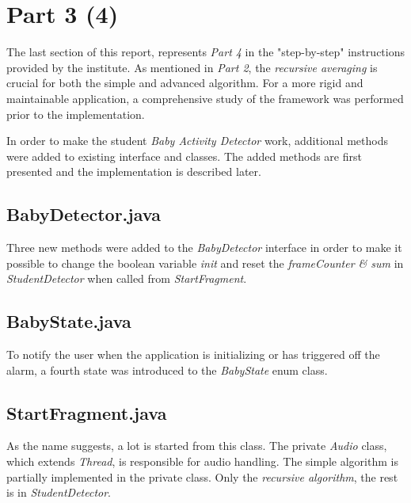 \newpage
\section{Part 3 (4)}
The last section of this report, represents \emph{Part 4} in the "step-by-step"
instructions provided by the institute. As mentioned in \emph{Part 2}, the 
\emph{recursive averaging} is crucial for both the simple and advanced algorithm. 
For a more rigid and maintainable application, a comprehensive study of the 
framework was performed prior to the implementation. 

In order to make the student \emph{Baby Activity Detector} work, additional
methods were added to existing interface and classes. The added methods are
first presented and the implementation is described later.

\subsection{BabyDetector.java}
Three new methods were added to the \emph{BabyDetector} interface in order to
make it possible to change the boolean variable \emph{init} and reset the 
\emph{frameCounter \& sum} in \emph{StudentDetector} when called from
\emph{StartFragment}.  



\subsection{BabyState.java}
To notify the user when the application is initializing or has
triggered off the alarm, a fourth state was introduced to the \emph{BabyState}
enum class. 



\subsection{StartFragment.java}
As the name suggests, a lot is started from this class. The private \emph{Audio}
class, which extends \emph{Thread}, is responsible for audio handling. The
simple algorithm is partially implemented in the private class. Only the
\emph{recursive algorithm}, the rest is in \emph{StudentDetector}. 



